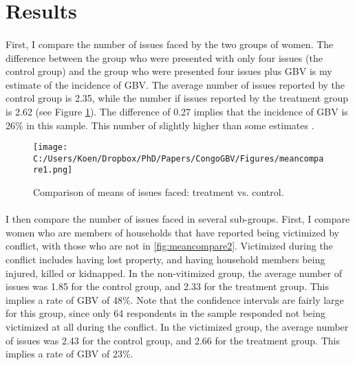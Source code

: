 \documentclass[11pt,a4paper]{scrartcl} %
\begin{document}

\section*{Results}

%	
%

\paragraph{}
First, I compare the number of issues faced by the two groups of women. The difference between the group who were presented with only four issues (the control group) and the group who were presented four issues plus GBV is my estimate of the incidence of GBV. The average number of issues reported by the control group is 2.35, while the number if issues reported by the treatment group is 2.62 (see Figure \ref{fig:meancompare1}). The difference of 0.27 implies that the incidence of GBV is 26\% in this sample. This number of slightly higher than some estimates \citep{Quattrochi2019}.

\begin{figure}
  \texttt{[image: C:/Users/Koen/Dropbox/PhD/Papers/CongoGBV/Figures/meancompare1.png]}
  \caption{Comparison of means of issues faced: treatment vs. control.}
  \label{fig:meancompare1}
\end{figure}

\paragraph{}
I then compare the number of issues faced in several sub-groups. First, I compare women who are members of households that have reported being victimized by conflict, with those who are not in \ref{fig:meancompare2}. Victimized during the conflict includes having lost property, and having household members being injured, killed or kidnapped. In the non-vitimized group, the average number of issues was 1.85 for the control group, and 2.33 for the treatment group. This implies a rate of GBV of 48\%. Note that the confidence intervals are fairly large for this group, since only 64 respondents in the sample responded not being victimized at all during the conflict. In the victimized group, the average number of issues was 2.43 for the control group, and 2.66 for the treatment group. This implies a rate of GBV of 23\%. 
\end{document}
